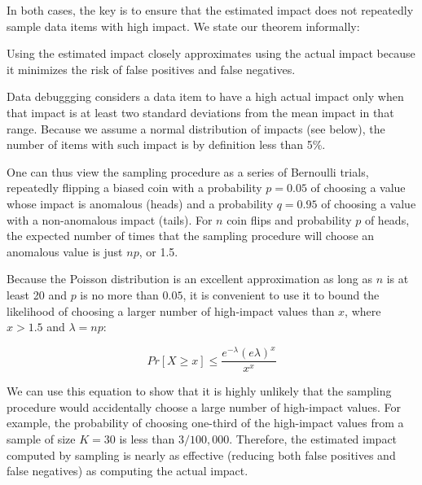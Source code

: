 In both cases, the key is to ensure that the estimated impact does not
repeatedly sample data items with high impact. We state our theorem informally:

\begin{theorem}
Using the estimated impact closely approximates using the actual impact because it minimizes the risk of false positives and false negatives.
\end{theorem}

Data debuggging considers a data item to have a high actual impact
only when that impact is at least two standard deviations from the
mean impact in that range. Because we assume a normal distribution of
impacts (see below), the number of items with such impact is by
definition less than 5\%.

One can thus view the sampling procedure as a series of Bernoulli
trials, repeatedly flipping a biased coin with a probability $p =
0.05$ of choosing a value whose impact is anomalous (heads) and a
probability $q = 0.95$ of choosing a value with a non-anomalous impact
(tails). For $n$ coin flips and probability $p$ of heads, the expected
number of times that the sampling procedure will choose an anomalous
value is just $np$, or 1.5.

Because the Poisson distribution is an excellent approximation as long
as $n$ is at least 20 and $p$ is no more than $0.05$, it is convenient
to use it to bound the likelihood of choosing a larger number of
high-impact values than $x$, where $x > 1.5$ and $\lambda = np$:

\begin{equation}
Pr[X \geq x] \leq \frac{e^{-\lambda}(e \lambda)^x}{x^x}
\end{equation}

We can use this equation to show that it is highly unlikely that the
sampling procedure would accidentally choose a large number of
high-impact values. For example, the probability of choosing one-third
of the high-impact values from a sample of size $K = 30$ is less than
$3/100,000$. Therefore, the estimated impact computed by sampling is
nearly as effective (reducing both false positives and false
negatives) as computing the actual impact.

